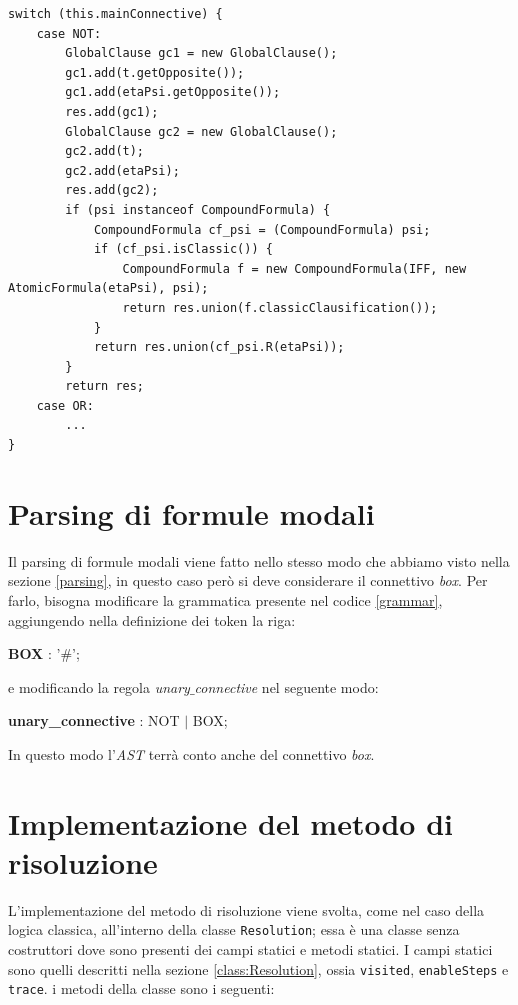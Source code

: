 \documentclass[a4paper,12pt]{report}
\begin{document}
\begin{minipage}{\linewidth}
    \small
    \begin{lstlisting}[caption={Parte del metodo \texttt{R} della classe \texttt{CompoundFormula}}, label={R}]
switch (this.mainConnective) {
    case NOT:
        GlobalClause gc1 = new GlobalClause();
        gc1.add(t.getOpposite());
        gc1.add(etaPsi.getOpposite());
        res.add(gc1);
        GlobalClause gc2 = new GlobalClause();
        gc2.add(t);
        gc2.add(etaPsi);
        res.add(gc2);
        if (psi instanceof CompoundFormula) {
            CompoundFormula cf_psi = (CompoundFormula) psi;
            if (cf_psi.isClassic()) {
                CompoundFormula f = new CompoundFormula(IFF, new AtomicFormula(etaPsi), psi);
                return res.union(f.classicClausification());
            }
            return res.union(cf_psi.R(etaPsi));
        }
        return res;
    case OR:
        ...
}
    \end{lstlisting}
\end{minipage}

\section*{Parsing di formule modali}
Il parsing di formule modali viene fatto nello stesso modo che abbiamo visto nella sezione \ref{parsing}, in questo caso però si deve considerare il connettivo \emph{box}. Per farlo, bisogna modificare la grammatica presente nel codice \ref{grammar}, aggiungendo nella definizione dei token la riga:
\begin{center}
    \textbf{BOX} : '$\#$';
\end{center}
e modificando la regola \emph{unary$\_$connective} nel seguente modo:
\begin{center}
    \textbf{unary\_connective} : NOT $|$  BOX;
\end{center}
In questo modo l'\emph{AST} terrà conto anche del connettivo \emph{box}.

\section{Implementazione del metodo di risoluzione}
\label{impl_res_modal}
L'implementazione del metodo di risoluzione viene svolta, come nel caso della logica classica, all'interno della classe \texttt{Resolution}; essa è una classe senza costruttori dove sono presenti dei campi statici e metodi statici. I campi statici sono quelli descritti nella sezione \ref{class:Resolution}, ossia \texttt{visited}, \texttt{enableSteps} e \texttt{trace}. i metodi della classe sono i seguenti:
\end{document}
